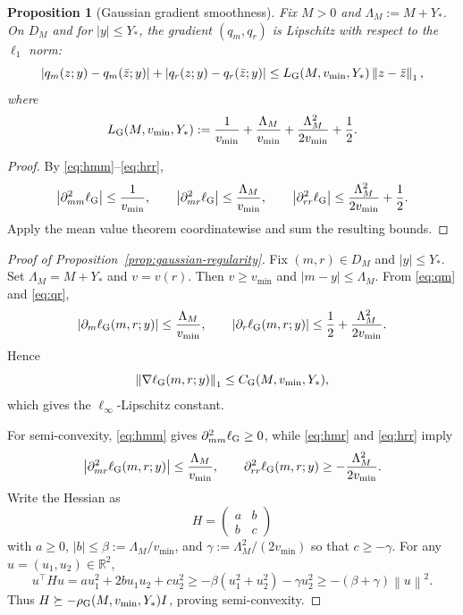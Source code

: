 \documentclass[11pt]{article}
\newtheorem{proposition}[theorem]{Proposition}
\theoremstyle{definition}
\newcommand{\R}{\mathbb{R}}
\newcommand{\norm}[1]{\left\lVert #1 \right\rVert}
\newcommand{\abs}[1]{\left\lvert #1 \right\rvert}
\begin{document}
\begin{proposition}[Gaussian gradient smoothness]
\label{prop:gaussian-smoothness}
Fix $M>0$ and $\Lambda_M:=M+Y_\ast$. On $D_M$ and for $\abs{y}\le Y_\ast$, the
gradient $(q_m,q_r)$ is Lipschitz with respect to the $\ell_1$ norm:
\begin{equation}
  \abs{q_m(z;y)-q_m(\bar z;y)}+\abs{q_r(z;y)-q_r(\bar z;y)}
  \le
  L_{\rm G}(M,v_{\min},Y_\ast)\norm{z-\bar z}_1,
  \label{eq:gaussian-smoothness}
\end{equation}
where
\begin{equation}
  L_{\rm G}(M,v_{\min},Y_\ast)
  :=
  \frac1{v_{\min}}+\frac{\Lambda_M}{v_{\min}}+\frac{\Lambda_M^2}{2v_{\min}}+\frac12.
  \label{eq:LG}
\end{equation}
\end{proposition}

\begin{proof}
By \eqref{eq:hmm}--\eqref{eq:hrr},
\[
  \abs{\partial_{mm}^2\ell_{\rm G}}\le \frac1{v_{\min}},
  \qquad
  \abs{\partial_{mr}^2\ell_{\rm G}}\le \frac{\Lambda_M}{v_{\min}},
  \qquad
  \abs{\partial_{rr}^2\ell_{\rm G}}\le \frac{\Lambda_M^2}{2v_{\min}}+\frac12.
\]
Apply the mean value theorem coordinatewise and sum the resulting bounds.
\end{proof}

\begin{proof}[Proof of Proposition~\ref{prop:gaussian-regularity}]
Fix $(m,r)\in D_M$ and $\abs{y}\le Y_\ast$. Set $\Lambda_M=M+Y_\ast$ and
$v=v(r)$. Then $v\ge v_{\min}$ and $\abs{m-y}\le \Lambda_M$. From
\eqref{eq:qm} and \eqref{eq:qr},
\[
  \abs{\partial_m \ell_{\rm G}(m,r;y)}
  \le
  \frac{\Lambda_M}{v_{\min}},
  \qquad
  \abs{\partial_r \ell_{\rm G}(m,r;y)}
  \le
  \frac12+\frac{\Lambda_M^2}{2v_{\min}}.
\]
Hence
\[
  \norm{\nabla \ell_{\rm G}(m,r;y)}_1
  \le
  C_{\rm G}(M,v_{\min},Y_\ast),
\]
which gives the $\ell_\infty$-Lipschitz constant.

For semi-convexity, \eqref{eq:hmm} gives $\partial_{mm}^2\ell_{\rm G}\ge 0$,
while \eqref{eq:hmr} and \eqref{eq:hrr} imply
\[
  \abs{\partial_{mr}^2\ell_{\rm G}(m,r;y)}
  \le
  \frac{\Lambda_M}{v_{\min}},
  \qquad
  \partial_{rr}^2\ell_{\rm G}(m,r;y)
  \ge
  -\frac{\Lambda_M^2}{2v_{\min}}.
\]
Write the Hessian as
\[
  H=
  \begin{pmatrix}
    a & b \\
    b & c
  \end{pmatrix}
\]
with $a\ge 0$, $\abs{b}\le \beta:=\Lambda_M/v_{\min}$, and
$\gamma:=\Lambda_M^2/(2v_{\min})$ so that $c\ge -\gamma$. For any
$u=(u_1,u_2)\in\R^2$,
\[
  u^\top H u
  =
  a u_1^2 + 2b u_1u_2 + c u_2^2
  \ge
  -\beta(u_1^2+u_2^2)-\gamma u_2^2
  \ge
  -(\beta+\gamma)\norm{u}^2.
\]
Thus $H\succeq -\rho_{\rm G}(M,v_{\min},Y_\ast)I$, proving
semi-convexity.
\end{proof}
\end{document}
